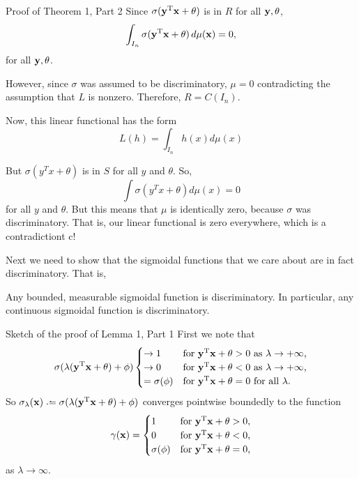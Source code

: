 \documentclass[11pt,letterpaper]{beamer}
\begin{document}
\begin{frame}{Proof of Theorem 1, Part 2}
  Since $\sigma(\mathbf{y}^{\mathrm{T}}\mathbf{x}+\theta)$ is in $R$ for all $\mathbf{y},\theta$,
  \[
    \int_{I_n}\sigma(\mathbf{y}^{\mathrm{T}}\mathbf{x}+\theta)\mathop{}\!d\mu(\mathbf{x})=0,
  \]
  for all $\mathbf{y},\theta$.

  However, since $\sigma$ was assumed to be discriminatory, $\mu=0$
  contradicting the assumption that $L$ is nonzero. Therefore, $R=C(I_n)$.
\end{frame}

\begin{frame}{}
  Now, this linear functional has the form
  \[
L(h) = \int_{I_n} h(x) d\mu(x)
\]

But $\sigma(y^T x + \theta)$ is in $S$ for all $y$ and $\theta$. So,
\[
\int \sigma(y^Tx + \theta) d \mu(x) = 0
\]
 for all $y$ and $\theta$. But this means that $\mu$ is identically zero,
 because $\sigma$ was discriminatory. That is, our linear functional is zero
 everywhere, which is a contradictiont c!
\end{frame}

\begin{frame}
  Next we need to show that the sigmoidal functions that we care about are in
  fact discriminatory. That is, 
  \begin{lemma}
    Any bounded, measurable sigmoidal function is discriminatory. In particular,
    any continuous sigmoidal function is discriminatory.
  \end{lemma}
\end{frame}

\begin{frame}{Sketch of the proof of Lemma 1, Part 1}
  First we note that
  \[
    \sigma(\lambda(\mathbf{y}^{\mathrm{T}}\mathbf{x}+\theta)+\phi)
    \begin{cases}
      \to 1&\text{for $\mathbf{y}^{\mathrm{T}}\mathbf{x}+\theta>0$ as $\lambda\to+\infty$,}\\
      \to 0&\text{for $\mathbf{y}^{\mathrm{T}}\mathbf{x}+\theta<0$ as $\lambda\to+\infty$,}\\
      =\sigma(\phi)&\text{for $\mathbf{y}^{\mathrm{T}}\mathbf{x}+\theta=0$ for all $\lambda$.}
    \end{cases}
  \]
  So $\sigma_\lambda(\bfx)\bdef\sigma(\lambda(\bfy^\rmT\bfx+\theta)+\phi)$
  converges pointwise boundedly to the function
  \[
    \gamma(\mathbf{x})=\begin{cases}
      1&\text{for $\mathbf{y}^{\mathrm{T}}\mathbf{x}+\theta>0$,}\\
      0&\text{for $\mathbf{y}^{\mathrm{T}}\mathbf{x}+\theta<0$,}\\
      \sigma(\phi)&\text{for $\mathbf{y}^{\mathrm{T}}\mathbf{x}+\theta=0$,}
    \end{cases}
  \]
  as $\lambda\to\infty$.
\end{frame}
\end{document}
